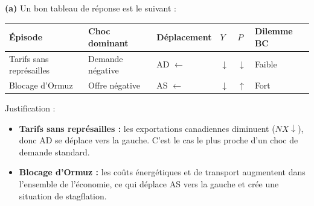 \begin{reponse}
\textbf{(a)} Un bon tableau de réponse est le suivant :

\begin{center}
\renewcommand{\arraystretch}{1.2}
\begin{tabular}{p{3.2cm} p{2.5cm} p{2.2cm} p{1.5cm} p{1.5cm} p{2.4cm}}
\toprule
\textbf{Épisode} & \textbf{Choc dominant} & \textbf{Déplacement} & \textbf{$Y$} & \textbf{$P$} & \textbf{Dilemme BC} \\
\midrule
Tarifs sans représailles & Demande négative & AD $\leftarrow$ & $\downarrow$ & $\downarrow$ & Faible \\
Blocage d'Ormuz & Offre négative & AS $\leftarrow$ & $\downarrow$ & $\uparrow$ & Fort \\
\bottomrule
\end{tabular}
\end{center}

Justification :
\begin{itemize}
   \item \textbf{Tarifs sans représailles :} les exportations canadiennes diminuent ($NX \downarrow$), donc AD se déplace vers la gauche. C'est le cas le plus proche d'un choc de demande standard.
   \item \textbf{Blocage d'Ormuz :} les coûts énergétiques et de transport augmentent dans l'ensemble de l'économie, ce qui déplace AS vers la gauche et crée une situation de stagflation.
\end{itemize}


\end{reponse}
